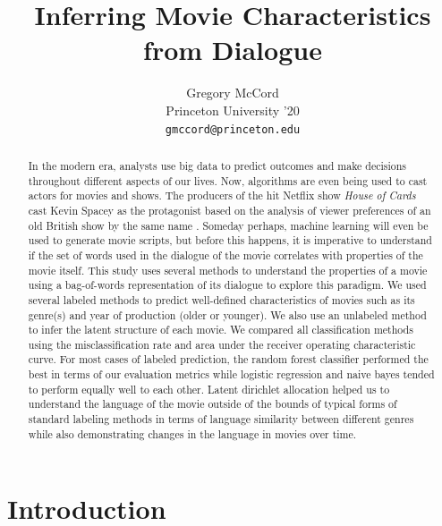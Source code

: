 \documentclass{article} %
\title{Inferring Movie Characteristics from Dialogue}
\author{
Gregory McCord\\
Princeton University '20\\
\texttt{gmccord@princeton.edu} \\
}
\begin{document}
\maketitle

\begin{abstract}

In the modern era, analysts use big data to predict outcomes and make decisions throughout different aspects of our lives. Now, algorithms are even being used to cast actors for movies and shows. The producers of the hit Netflix show \textit{House of Cards} cast Kevin Spacey as the protagonist based on the analysis of viewer preferences of an old British show by the same name \cite{hoc}. Someday perhaps, machine learning will even be used to generate movie scripts, but before this happens, it is imperative to understand if the set of words used in the dialogue of the movie correlates with properties of the movie itself. This study uses several methods to understand the properties of a movie using a bag-of-words representation of its dialogue to explore this paradigm. We used several labeled methods to predict well-defined characteristics of movies such as its genre(s) and year of production (older or younger). We also use an unlabeled method to infer the latent structure of each movie. We compared all classification methods using the misclassification rate and area under the receiver operating characteristic curve. For most cases of labeled prediction, the random forest classifier performed the best in terms of our evaluation metrics while logistic regression and naive bayes tended to perform equally well to each other. Latent dirichlet allocation helped us to understand the language of the movie outside of the bounds of typical forms of standard labeling methods in terms of language similarity between different genres while also demonstrating changes in the language in movies over time.

\end{abstract}

\section{Introduction}
\end{document}
